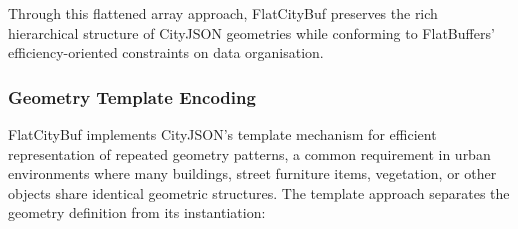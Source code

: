 Through this flattened array approach, FlatCityBuf preserves the rich hierarchical structure of CityJSON geometries while conforming to FlatBuffers' efficiency-oriented constraints on data organisation.

\subsubsection{Geometry Template Encoding}
\label{methodology:feature_encoding:geometry_encoding:templates}

FlatCityBuf implements CityJSON's template mechanism for efficient representation of repeated geometry patterns, a common requirement in urban environments where many buildings, street furniture items, vegetation, or other objects share identical geometric structures. The template approach separates the geometry definition from its instantiation:

